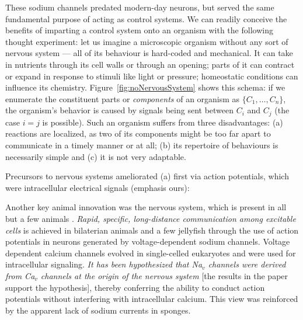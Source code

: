 These sodium channels predated modern-day neurons, but served the same fundamental purpose of acting as control systems. We can readily conceive the benefits of imparting a control system onto an organism with the following thought experiment: let us imagine a microscopic organism without any sort of nervous system --- all of its behaviour is hard-coded and mechanical. It can take in nutrients through its cell walls or through an opening; parts of it can contract or expand in response to stimuli like light or pressure; homeostatic conditions can influence its chemistry. Figure~\ref{fig:noNervousSystem} shows this schema: if we enumerate the constituent parts or {\em components} of an organism as $\{C_1,\dots,C_n\}$, the organism's behavior is caused by signals being sent between $C_i$ and $C_j$ (the case $i=j$ is possible). Such an organism suffers from three disadvantages: (a) reactions are localized, as two of its components might be too far apart to communicate in a timely manner or at all; (b) its repertoire of behaviours is necessarily simple and (c) it is not very adaptable.

Precursors to nervous systems ameliorated (a) first via action potentials, which were intracellular electrical signals \cite{Liebeskind31052011} (emphasis ours):
\begin{emquote}
Another key animal innovation was the nervous system, which is present in all but a few animals . {\em Rapid, specific, long-distance communication among excitable cells} is achieved in bilaterian animals and a few jellyfish  through the use of action potentials  in neurons generated by voltage-dependent sodium  channels. Voltage dependent calcium  channels evolved in single-celled eukaryotes and were used for intracellular signaling. {\em It has been hypothesized that Na$_v$ channels were derived from Ca$_v$ channels at the origin of the nervous system} \textsf{[the results in the paper support the hypothesis]}, thereby conferring the ability to conduct action potentials without interfering with intracellular calcium. This view was reinforced by the apparent lack of sodium currents in sponges.
\end{emquote}


